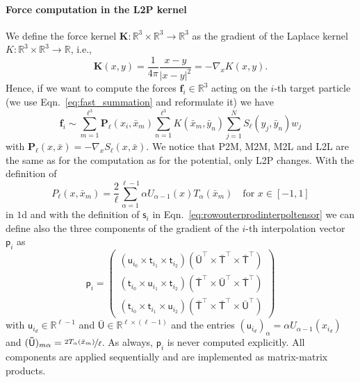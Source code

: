 \documentclass[]{article}
\newcommand{\Mat}[1]{\mathsf{#1}}  %
\theoremstyle{plain}
\begin{document}
\paragraph{Force computation in the L2P kernel} We define the force kernel
$\boldsymbol{K} : \mathbb{R}^3 \times \mathbb{R}^3 \rightarrow \mathbb{R}^3$
as the gradient of the Laplace kernel $K : \mathbb{R}^3 \times \mathbb{R}^3
\rightarrow \mathbb{R}$, i.e.,
\begin{equation}
  \label{eq:force_kernel}
  \boldsymbol{K}(x,y) = \frac{1}{4\pi} \frac{x-y}{|x-y|^2} = -\nabla_x K(x,y).
\end{equation}
Hence, if we want to compute the forces $\boldsymbol{f}_i\in\mathbb{R}^3$
acting on the $i$-th target particle (we use Eqn.~\eqref{eq:fast_summation}
and reformulate it) we have
\begin{equation}
  \label{eq:forcemodel}
  \boldsymbol{f}_i \sim \sum_{m=1}^{\ell^3} \boldsymbol{P}_\ell(x_i, \bar x_m)
  \sum_{n=1}^{\ell^3} K(\bar x_m, \bar y_n) \sum_{j=1}^N S_\ell(y_j, \bar y_n)
  w_j
\end{equation}
with $\boldsymbol{P}_\ell(x, \bar x) = -\nabla_x S_\ell(x, \bar x)$. We notice
that P2M, M2M, M2L and L2L are the same as for the computation as for the
potential, only L2P changes. With the definition of
\begin{equation}
  \label{eq:Pin1d}
  P_\ell(x,\bar x_m) = \frac{2}{\ell} \sum_{\alpha=1}^{\ell-1} \alpha
  U_{\alpha-1}(x) T_\alpha(\bar x_m) \quad \text{for } x\in[-1,1]
\end{equation}
in $1$d and with the definition of $\Mat{s}_i$ in
Eqn.~\eqref{eq:rowouterprodinterpoltensor} we can define also the three
components of the gradient of the $i$-th interpolation vector $\Mat{p}_i$ as
\begin{equation}
  \label{eq:rowouterprodinterpoltensorgradient}
  \Mat{p}_i = 
  \begin{pmatrix}
    (\Mat{u}_{i_0} \times \Mat{t}_{i_1} \times \Mat{t}_{i_2})
    \left(\Mat{\bar U}^\top \times \Mat{\bar T}^\top \times \Mat{\bar
        T}^\top\right)\\ 
    (\Mat{t}_{i_0} \times \Mat{u}_{i_1} \times \Mat{t}_{i_2})
    \left(\Mat{\bar T}^\top \times \Mat{\bar U}^\top \times \Mat{\bar
        T}^\top\right) \\ 
    (\Mat{t}_{i_0} \times \Mat{t}_{i_1} \times \Mat{u}_{i_2})
    \left(\Mat{\bar T}^\top \times \Mat{\bar T}^\top \times \Mat{\bar
        U}^\top\right) 
  \end{pmatrix}
\end{equation}
with $\Mat{u}_{i_d}\in\mathbb{R}^{\ell-1}$ and $\Mat{\bar
  U}\in\mathbb{R}^{\ell\times(\ell-1)}$ and the entries
$(\Mat{u}_{i_d})_{\alpha} = \alpha U_{\alpha-1}(x_{i_d})$ and $(\Mat{\bar
  U})_{m\alpha} = \nicefrac{2T_\alpha(\bar x_m)}{\ell}$. As always,
$\Mat{p}_i$ is never computed explicitly. All components are applied
sequentially and are implemented as matrix-matrix products.
\end{document}
